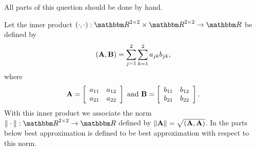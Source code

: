 All parts of this question should be done by hand.

Let the inner product $\ip{\cdot,\cdot}:\R^{2\times 2}\times\R^{2\times 2}\to\R$ be defined by
      \[ ({\bf A},{\bf B}) = \sum_{j=1}^2 \sum_{k=1}^2 a_{jk} b_{jk},\]
       where
      \[ {\bf A} = \left[\begin{array}{cc}a_{11} & a_{12} \\ a_{21} & a_{22}\end{array}\right]
\mbox{ and }
         {\bf B} = \left[\begin{array}{cc}b_{11} & b_{12} \\ b_{21} & b_{22}\end{array}\right].\]
      With this inner product we associate the norm $\norm{\cdot}:\R^{2\times 2}\to\R$ defined by $\|{\bf A}\| = \sqrt{({\bf A},{\bf A})}$. In the parts below best approximation is defined to be best approximation with respect to this norm.

